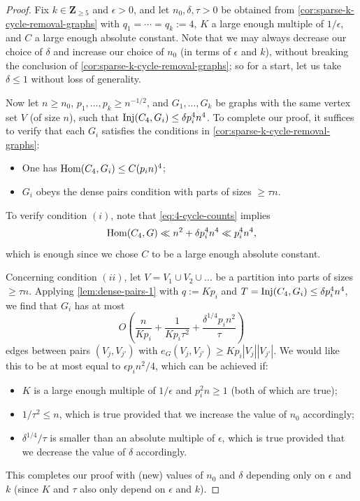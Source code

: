\documentclass[reqno,11pt]{amsart}
\theoremstyle{definition}
\theoremstyle{remark}
\numberwithin{equation}{section}
\newcommand{\Z}{\mathbf{Z}}
\newcommand{\Hom}{\textnormal{Hom}}
\newcommand{\Inj}{\textnormal{Inj}}
\begin{document}
\begin{proof}
Fix $k \in \Z_{\ge 5}$ and $\epsilon > 0$, and let $n_0, \delta, \tau > 0$ be obtained from \cref{cor:sparse-k-cycle-removal-graphs} with $q_1 = \cdots = q_k := 4$, $K$ a large enough multiple of $1/\epsilon$, and $C$ a large enough absolute constant. Note that we may always decrease our choice of $\delta$ and increase our choice of $n_0$ (in terms of $\epsilon$ and $k$), without breaking the conclusion of \cref{cor:sparse-k-cycle-removal-graphs}; so for a start, let us take $\delta \le 1$ without loss of generality.

Now let $n \ge n_0$, $p_1, \ldots, p_k \ge n^{-1/2}$, and $G_1, \ldots, G_k$ be graphs with the same vertex set $V$ (of size $n$), such that $\Inj(C_4, G_i) \le \delta p_i^4 n^4$. To complete our proof, it suffices to verify that each $G_i$ satisfies the conditions in \cref{cor:sparse-k-cycle-removal-graphs}:
\begin{itemize}
    \item[$(i)$.] One has $\Hom(C_4, G_i) \le C(p_i n)^{4}$;
    \item[$(ii)$.] $G_i$ obeys the dense pairs condition with parts of sizes $\ge \tau n$.
\end{itemize}
To verify condition $(i)$, note that \cref{eq:4-cycle-counts} implies 
\[
    \Hom(C_4, G) \ll n^2 + \delta p_i^4 n^4 \ll p_i^4 n^4,
\]
which is enough since we chose $C$ to be a large enough absolute constant.

Concerning condition $(ii)$, let $V = V_1 \cup V_2 \cup \ldots$ be a partition into parts of sizes $\ge \tau n$. Applying \cref{lem:dense-pairs-1} with $q := Kp_i$ and $T = \Inj(C_4, G_i) \le \delta p_i^4 n^4$, we find that $G_i$ has at most
\[
    O\left(\frac{n}{Kp_i} + \frac{1}{Kp_i \tau^2} + \frac{\delta^{1/4}p_i n^2}{\tau} \right)
\]
edges between pairs $(V_j, V_{j'})$ with $e_G(V_j, V_{j'}) \ge Kp_i |V_j| |V_{j'}|$. We would like this to be at most equal to $\epsilon p_i n^2/4$, which can be achieved if:
\begin{itemize}
    \item[(1).] $K$ is a large enough multiple of $1/\epsilon$ and $p_i^2 n \ge 1$ (both of which are true);
    \item[(2).] $1/\tau^2 \le n$, which is true provided that we increase the value of $n_0$ accordingly;
    \item[(3).] $\delta^{1/4}/\tau$ is smaller than an absolute multiple of $\epsilon$, which is true provided that we decrease the value of $\delta$ accordingly.
\end{itemize}
This completes our proof with (new) values of $n_0$ and $\delta$ depending only on $\epsilon$ and $k$ (since $K$ and $\tau$ also only depend on $\epsilon$ and $k$).
\end{proof}
\end{document}
